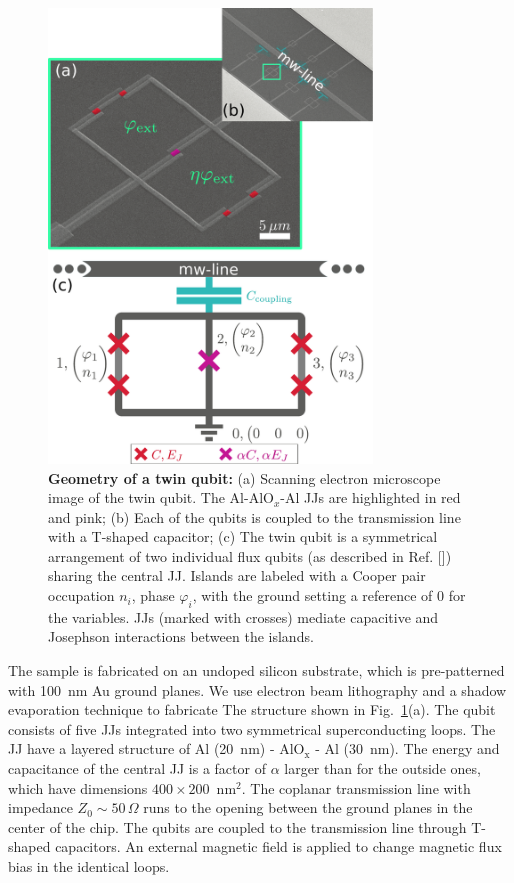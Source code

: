 \documentclass[%
reprint,
superscriptaddress,
bibnotes,
amsmath,
amssymb,
aps,
showkeys,
prb,
]{revtex4-2}
\begin{document}
\begin{figure}[htp]
\centering
  \includegraphics[width=8.6cm]{fig1}
  \caption{\small  \textbf{Geometry  of a  twin  qubit:}  (a) Scanning  electron
    microscope image of the twin qubit. The Al-AlO$_x$-Al JJs are highlighted in
    red and  pink; (b) Each  of the qubits is  coupled to the  transmission line
    with a T-shaped  capacitor; (c) The twin qubit is  a symmetrical arrangement
    of two individual  flux qubits (as described  in Ref. [\cite{Orlando_1999}]) sharing
    the central  JJ.  Islands are labeled  with a Cooper pair  occupation $n_i$,
    phase $\varphi_i$, with the  ground setting a reference of 0 for
    the variables.   JJs  (marked with  crosses)  mediate capacitive  and
    Josephson  interactions between  the islands.
  }
  \label{fig:setup}
\end{figure}

The sample is fabricated on an undoped silicon substrate, which is
pre-patterned with 100~nm Au ground planes. We  use electron beam lithography 
and a shadow evaporation  technique to fabricate The structure shown in
Fig.~\ref{fig:setup}(a). The qubit consists of five JJs integrated into two
symmetrical  superconducting  loops. The  JJ  have  a   layered  structure  of
Al (20~nm) - AlO$_{\text{x}}$ - Al (30~nm).  The energy  and  capacitance of  the
central JJ  is a  factor of  $\alpha$ larger than  for the  outside ones,  which have
dimensions $400\times200$~nm$^2$.    The  coplanar  transmission   line  with
impedance $ Z_{0} \sim 50\,\Omega $ runs to the opening between the ground planes in the
center of the chip. The qubits are coupled to the transmission line
through T-shaped  capacitors.  An external magnetic field is applied to change magnetic flux bias in the identical loops.
\end{document}
